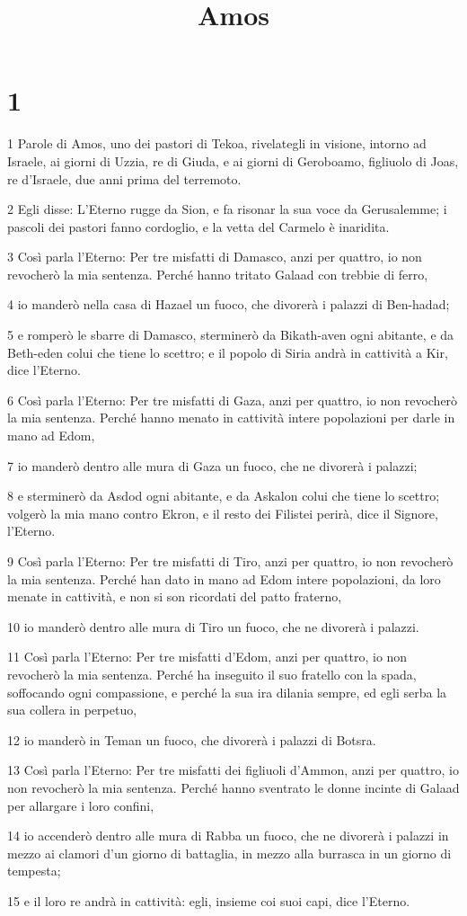 

\title{Amos}


\chapter{1}

\par 1 Parole di Amos, uno dei pastori di Tekoa, rivelategli in visione, intorno ad Israele, ai giorni di Uzzia, re di Giuda, e ai giorni di Geroboamo, figliuolo di Joas, re d'Israele, due anni prima del terremoto.
\par 2 Egli disse: L'Eterno rugge da Sion, e fa risonar la sua voce da Gerusalemme; i pascoli dei pastori fanno cordoglio, e la vetta del Carmelo è inaridita.
\par 3 Così parla l'Eterno: Per tre misfatti di Damasco, anzi per quattro, io non revocherò la mia sentenza. Perché hanno tritato Galaad con trebbie di ferro,
\par 4 io manderò nella casa di Hazael un fuoco, che divorerà i palazzi di Ben-hadad;
\par 5 e romperò le sbarre di Damasco, sterminerò da Bikath-aven ogni abitante, e da Beth-eden colui che tiene lo scettro; e il popolo di Siria andrà in cattività a Kir, dice l'Eterno.
\par 6 Così parla l'Eterno: Per tre misfatti di Gaza, anzi per quattro, io non revocherò la mia sentenza. Perché hanno menato in cattività intere popolazioni per darle in mano ad Edom,
\par 7 io manderò dentro alle mura di Gaza un fuoco, che ne divorerà i palazzi;
\par 8 e sterminerò da Asdod ogni abitante, e da Askalon colui che tiene lo scettro; volgerò la mia mano contro Ekron, e il resto dei Filistei perirà, dice il Signore, l'Eterno.
\par 9 Così parla l'Eterno: Per tre misfatti di Tiro, anzi per quattro, io non revocherò la mia sentenza. Perché han dato in mano ad Edom intere popolazioni, da loro menate in cattività, e non si son ricordati del patto fraterno,
\par 10 io manderò dentro alle mura di Tiro un fuoco, che ne divorerà i palazzi.
\par 11 Così parla l'Eterno: Per tre misfatti d'Edom, anzi per quattro, io non revocherò la mia sentenza. Perché ha inseguito il suo fratello con la spada, soffocando ogni compassione, e perché la sua ira dilania sempre, ed egli serba la sua collera in perpetuo,
\par 12 io manderò in Teman un fuoco, che divorerà i palazzi di Botsra.
\par 13 Così parla l'Eterno: Per tre misfatti dei figliuoli d'Ammon, anzi per quattro, io non revocherò la mia sentenza. Perché hanno sventrato le donne incinte di Galaad per allargare i loro confini,
\par 14 io accenderò dentro alle mura di Rabba un fuoco, che ne divorerà i palazzi in mezzo ai clamori d'un giorno di battaglia, in mezzo alla burrasca in un giorno di tempesta;
\par 15 e il loro re andrà in cattività: egli, insieme coi suoi capi, dice l'Eterno.

